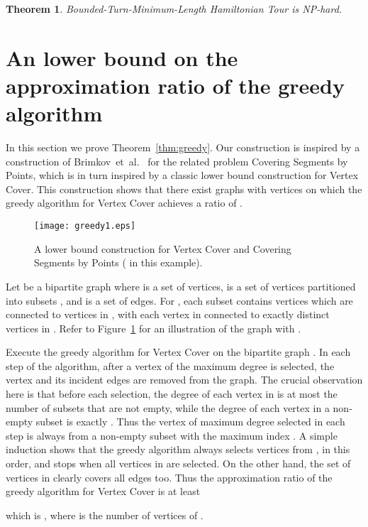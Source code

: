 \documentclass[letterpaper,11pt]{article}
\newtheorem{theorem}{Theorem}
\def\etal{{et~al.}}
\begin{document}
\begin{theorem}\label{thm:hamiltonian2}
{\sc Bounded-Turn-Minimum-Length Hamiltonian Tour} is NP-hard.
\end{theorem}


\section{An  lower bound on the approximation ratio of
  the greedy algorithm} 

In this section we prove Theorem~\ref{thm:greedy}.
Our construction is inspired by a construction of Brimkov~\etal~\cite{BLWM12}
for the related problem {\sc Covering Segments by Points},
which is in turn inspired by a classic lower bound construction for {\sc Vertex Cover}.
This construction shows that there exist graphs with  vertices 
on which the greedy algorithm for {\sc Vertex Cover} achieves
a ratio of . 
\begin{figure}[htb]
\centering\texttt{[image: greedy1.eps]}
\caption{A lower bound construction for {\sc Vertex Cover} and 
{\sc Covering Segments by Points} 
( in this example).}
\label{fig:greedy1}
\end{figure}

Let  be a bipartite graph
where  is a set of  vertices,
 is a set of  vertices
partitioned into  subsets ,
and  is a set of  edges.
For ,
each subset  contains  vertices
which are connected to  vertices in ,
with each vertex in  connected to exactly  distinct vertices in .
Refer to Figure~\ref{fig:greedy1} for an illustration of the graph  with
.

Execute the greedy algorithm for {\sc Vertex Cover} on the bipartite graph .
In each step of the algorithm,
after a vertex of the maximum degree is selected,
the vertex and its incident edges are removed from the graph.
The crucial observation here is that before each selection,
the degree of each vertex in  is at most the number of subsets 
that are not empty,
while the degree of each vertex in a non-empty subset  is exactly .
Thus the vertex of maximum degree selected in each step
is always from a non-empty subset  with the maximum index .
A simple induction shows that the greedy algorithm always selects vertices
from , in this order, and stops when all vertices
in  are selected.
On the other hand, the set of vertices in  clearly covers all edges too.
Thus the approximation ratio of the greedy algorithm for Vertex Cover is
at least

which is , where  is the number
of vertices of .
\end{document}

